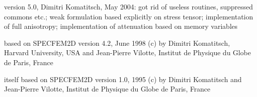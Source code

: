 version 5.0, Dimitri Komatitsch, May 2004:\newline
got rid of useless routines, suppressed commons etc.;
weak formulation based explicitly on stress tensor;
implementation of full anisotropy;
implementation of attenuation based on memory variables\newline

based on SPECFEM2D version 4.2, June 1998\newline
(c) by Dimitri Komatitsch, Harvard University, USA
and Jean-Pierre Vilotte, Institut de Physique du Globe de Paris, France

itself based on SPECFEM2D version 1.0, 1995\newline
(c) by Dimitri Komatitsch and Jean-Pierre Vilotte,
Institut de Physique du Globe de Paris, France



